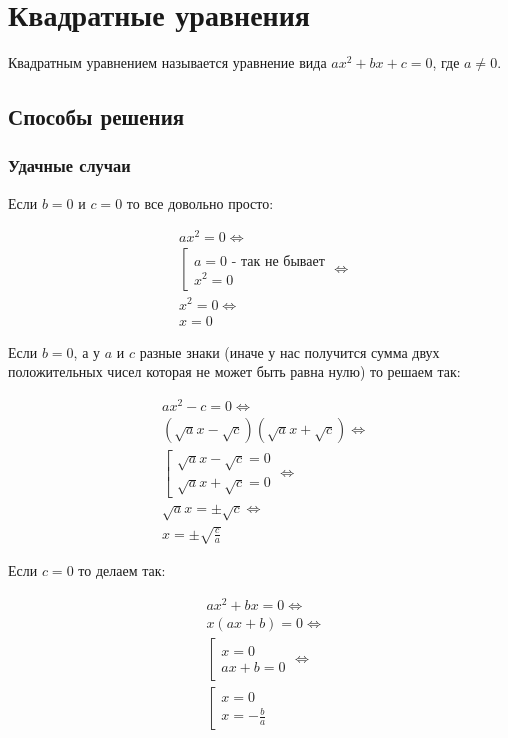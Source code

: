 \chapter{Квадратные уравнения}

\begin{definition}
	Квадратным уравнением называется уравнение вида $ax^2 + bx + c = 0$, где $a \neq 0$. 
\end{definition}

\section{Способы решения}

\subsection{Удачные случаи}

Если $b = 0$ и $c = 0$ то все довольно просто:

\begin{align*}
	& ax^2 = 0 \iff \\
	& \left[\begin{array}{l}
		a = 0 \text{ - так не бывает}\\
		x^2 = 0
	\end{array}\right. \iff \\
	& x^2 = 0 \iff \\
	& x = 0
\end{align*}

Если $b = 0$, а у $a$ и $c$ разные знаки (иначе у нас получится сумма двух положительных чисел которая не может быть равна нулю) то решаем так:

\begin{align*}
	& ax^2 - c = 0 \iff \\
	& (\sqrt{a}x - \sqrt{c})(\sqrt{a}x + \sqrt{c}) \iff \\
	& \left[\begin{array}{l}
		\sqrt{a}x - \sqrt{c} = 0 \\
		\sqrt{a}x + \sqrt{c} = 0
	\end{array}\right. \iff \\
	& \sqrt{a}x = \pm \sqrt{c} \iff \\
	& x = \pm \sqrt{\frac{c}{a}}
\end{align*}

Если $c = 0$ то делаем так:

\begin{align*}
	& ax^2 + bx = 0 \iff \\
	& x(ax + b) = 0 \iff \\
	& \left[\begin{array}{l}
		x = 0 \\
		ax + b = 0
	\end{array}\right. \iff \\
	& \left[\begin{array}{l}
		x = 0 \\
		x = - \frac{b}{a}
	\end{array}\right.  
\end{align*}

